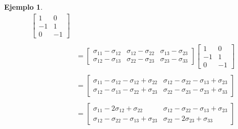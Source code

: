 \documentclass[
]{book}
\theoremstyle{definition}
\theoremstyle{definition}
\newtheorem{example}{Ejemplo}[chapter]
\theoremstyle{definition}
\theoremstyle{definition}
\theoremstyle{remark}
\begin{document}
\begin{example}
\begin{align*}
\begin{bmatrix}
1 & 0 \\ 
-1 & 1\\
0 & -1
\end{bmatrix}\\ \\ 
&=\begin{bmatrix}
\sigma_{11}-\sigma_{12} & \sigma_{12}-\sigma_{22} & \sigma_{13}-
\sigma_{23}\\
\sigma_{12}-\sigma_{13} & \sigma_{22}-\sigma_{23} & \sigma_{23}-
\sigma_{33}
\end{bmatrix} \begin{bmatrix}
1 & 0 \\ 
-1 & 1\\
0 & -1
\end{bmatrix}\\ \\
&=\begin{bmatrix}
\sigma_{11}-\sigma_{12}-\sigma_{12}+\sigma_{22} & \sigma_{12}-\sigma_{22}-\sigma_{13}+\sigma_{23} \\
\sigma_{12}-\sigma_{13}-\sigma_{22}+\sigma_{23} &  \sigma_{22}-\sigma_{23}-\sigma_{23}+
\sigma_{33}
\end{bmatrix}\\
\\ 
&=\begin{bmatrix}
\sigma_{11}-2\sigma_{12}+\sigma_{22} & \sigma_{12}-\sigma_{22}-\sigma_{13}+\sigma_{23} \\
\sigma_{12}-\sigma_{22}-\sigma_{13}+\sigma_{23} &  \sigma_{22}-2\sigma_{23}+\sigma_{33}
\end{bmatrix}
\end{align*}
\end{example}
\end{document}
